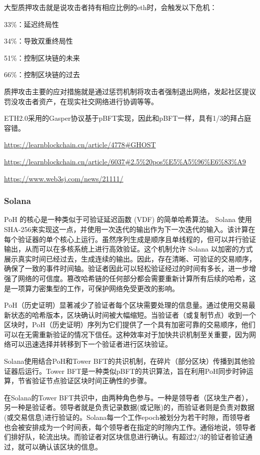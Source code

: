 \documentclass[a4paper,twoside]{scrbook}
\begin{document}
\begin{CJK}{UTF8}{gbsn}
大型质押攻击就是说攻击者持有相应比例的eth时，会触发以下危机：

33\%：延迟终局性

34\%：导致双重终局性

51\%：控制区块链的未来

66\%：控制区块链的过去

质押攻击主要的应对措施就是通过惩罚机制将攻击者强制退出网络，发起社区提议罚没攻击者资产，在现实社交网络进行协调等等。

ETH2.0采用的Gasper协议基于pBFT实现，因此和pBFT一样，具有1/3的拜占庭容错。

\url{https://learnblockchain.cn/article/4778#GHOST}

\url{https://learnblockchain.cn/article/6037#2.5%20pos%E5%A5%96%E6%83%A9}

\url{https://www.web3sj.com/news/21111/}

\subsubsection{Solana}
PoH 的核心是一种类似于可验证延迟函数 (VDF) 的简单哈希算法。 Solana 使用SHA-256来实现这一点，并使用一次迭代的输出作为下一次迭代的输入。该计算在每个验证器的单个核心上运行。虽然序列生成是顺序且单线程的，但可以并行验证输出，从而可以在多核系统上进行高效验证。这个机制允许 Solana 以加密的方式展示真实时间已经过去，生成连续的输出。因此，存在清晰、可验证的交易顺序，确保了一致的事件时间轴。验证者因此可以轻松验证经过的时间有多长，进一步增强了网络的可信度。篡改哈希链的任何部分都会需要重新计算所有后续的哈希，这是一项算力密集型的工作，可保护网络免受更改的影响。

PoH（历史证明）显著减少了验证者每个区块需要处理的信息量。通过使用交易最新状态的哈希版本，区块确认时间被大幅缩短。当验证者（或复制节点）收到一个区块时，PoH（历史证明）序列为它们提供了一个具有加密可靠的交易顺序，他们可以在无需重新验证的情况下信任。这种效率对于加快共识机制至关重要，因为网络可以迅速选择并转移到下一个验证者进行区块验证。

Solana使用结合PoH和Tower BFT的共识机制，在碎片（部分区块）传播到其他验证器后运行。Tower BFT是一种类似pBFT的共识算法，旨在利用PoH同步时钟运算，节省验证节点验证区块时间正确性的步骤。

在Solana的Tower BFT共识中，由两种角色参与。一种是领导者（区块生产者），另一种是验证者。领导者就是负责记录数据(或记账)的，而验证者则是负责对数据(或交易信息)进行验证的。Solana每一个工作epoch被划分为若干时隙，而领导者也会被安排成为一个时间表，每个领导者在指定的时隙内工作。通俗地说，领导者们排好队，轮流出块。而验证者对区块信息进行确认。有超过2/3的验证者验证通过，就可以确认该区块的信息。


\end{CJK}
\end{document}
